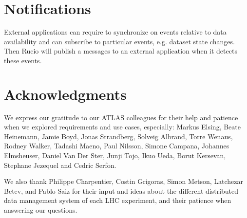 \documentclass{atlasnote}
\begin{document}
\section{Notifications}
\label{overview_Notifications:notifications}

External applications can require to synchronize on events relative to data availability and can subscribe to particular events, e.g. dataset state changes. Then Rucio will publish a messages to an external application when it detects these events.

\section*{Acknowledgments}
\label{Acknowledgments:acknowledgments}
We express our gratitude to our ATLAS colleagues for their help and patience when we explored requirements and use cases, especially: Markus Elsing, Beate Heinemann, Jamie Boyd, Jonas Strandberg, Solveig Albrand, Torre Wenaus, Rodney Walker, Tadashi Maeno, Paul Nilsson, Simone Campana, Johannes Elmsheuser, Daniel Van Der Ster, Junji Tojo, Ikuo Ueda, Borut Kersevan, Stephane Jezequel and Cedric Serfon.

We also thank Philippe Charpentier, Costin Grigoras, Simon Metson, Latchezar Betev, and Pablo Saiz for their input and ideas about the different distributed data management system of each LHC experiment, and their patience when answering our questions.

\newpage

\label{rucio:appendices}
\end{document}
